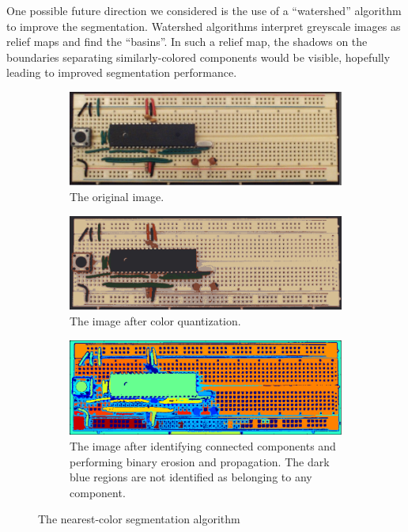 \documentclass[10pt,twocolumn,letterpaper]{article}
\begin{document}
One possible future direction we considered is the use of a
``watershed'' algorithm to improve the segmentation. Watershed
algorithms interpret greyscale images as relief maps and find the
``basins''. In such a relief map, the shadows on the boundaries
separating similarly-colored components would be visible, hopefully
leading to improved segmentation performance.

\begin{figure}[ht]
\centering
\begin{subfigure}[b]{\linewidth}
	\centering
   \includegraphics[width=0.9\linewidth]{demos/original_of_comp.png}
	\caption{The original image.}
	\label{fig:segment-orig}
\end{subfigure}
\begin{subfigure}[b]{\linewidth}
	\centering
   \includegraphics[width=0.9\linewidth]{demos/quantized_img2.png}
	\caption{The image after color quantization.}
	\label{fig:segment-quantized}
\end{subfigure}
\begin{subfigure}[b]{\linewidth}
	\centering
   \includegraphics[width=0.9\linewidth]{demos/connectedcomponents_jet_img2.png}
	\caption{The image after identifying connected components and
      performing binary erosion and propagation. The dark blue regions
      are not identified as belonging to any component.}
	\label{fig:segment-connected}
\end{subfigure}
\caption{The nearest-color segmentation algorithm}
\end{figure}
\end{document}
